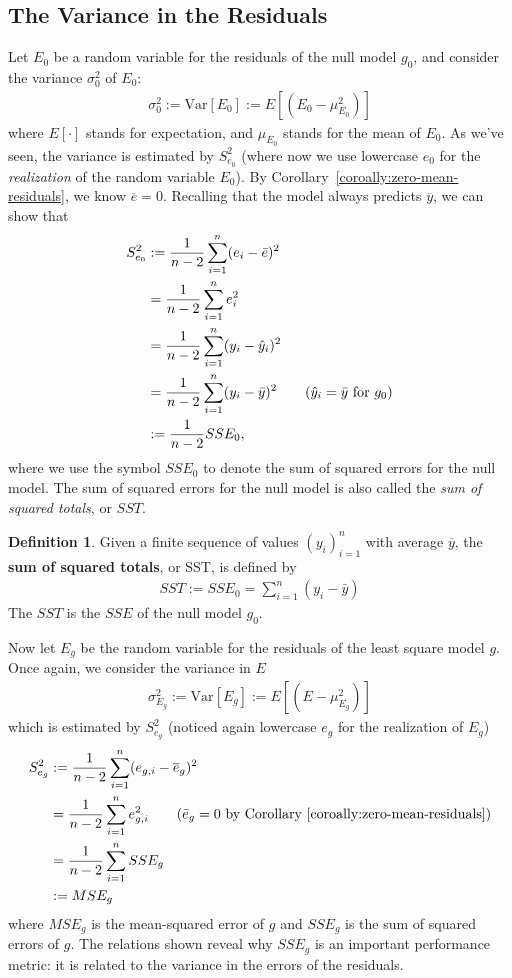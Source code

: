 \documentclass[12pt, a4paper]{article}
\theoremstyle{definition}
\newtheorem*{definition}{Definition}
\begin{document}
	\subsection*{The Variance in the Residuals}
	Let $E_0$ be a random variable for the residuals of the null model $g_0$,
	and consider the variance $\sigma_0^2$ of $E_0$:
	\begin{align*}
		\sigma_{0}^2 := \text{Var}[E_0] := E[(E_0-\mu_{E_0}^2)]
	\end{align*}
	where $E[\cdot]$ stands for expectation, and $\mu_{E_0}$ stands for the mean
	of $E_0$. As we've seen, the variance is estimated by $S^2_{e_0}$
	(where now we use lowercase $e_0$ for the \emph{realization} of the
	random variable $E_0$). By Corollary~\ref{coroally:zero-mean-residuals}, we
	know $\overline{e}=0$. Recalling that the model always predicts $\overline{y}$,
	we can show that
	\begin{align*}
		S_{e_0}^2 &:= \frac{1}{n-2}\sum_{i=1}^{n}(e_i-\bar{e})^2\\
		&=\frac{1}{n-2}\sum_{i=1}^{n}e_i^2\\
		&=\frac{1}{n-2}\sum_{i=1}^{n}(y_i-\hat{y}_i)^2\\
		&=\frac{1}{n-2}\sum_{i=1}^{n}(y_i-\bar{y})^2
		\tag{$\hat{y}_i=\bar{y}$ for $g_0$}\\
		&:=\frac{1}{n-2}SSE_0,
	\end{align*}
	where we use the symbol $SSE_0$ to denote the sum of squared errors for the null model.
	The sum of squared errors for the null model is also called the \emph{sum of squared totals},
	or $SST$.
	\begin{tcolorbox}[breakable]
		\begin{definition}
			Given a finite sequence of values $(y_i)_{i=1}^{n}$ with average $\overline{y}$,
			the \textbf{sum of squared totals}, or SST, is defined by
			\begin{align*}
				SST := SSE_0 = \sum_{i=1}^{n}(y_i-\bar{y})
			\end{align*}
			The $SST$ is the $SSE$ of the null model $g_0$.
		\end{definition}
	\end{tcolorbox}
	Now let $E_g$ be the random variable for the residuals of the least square model $g$.
	Once again, we consider the variance in $E$
	\begin{align*}
		\sigma_{E_g}^2 := \text{Var}[E_g] := E[(E-\mu_{E_g}^2)]
	\end{align*}
	which is estimated by $S_{e_g}^2$ (noticed again lowercase $e_g$ for the realization of $E_g$)
	\begin{align*}
		S_{e_g}^2 &:= \frac{1}{n-2} \sum_{i=1}^{n}(e_{g,i}-\overline{e}_g)^2\\
		&=\frac{1}{n-2}\sum_{i=1}^{n}e_{g,i}^2
		\tag{$\bar{e}_g=0$ by Corollary~\ref{coroally:zero-mean-residuals}}\\
		&=\frac{1}{n-2}\sum_{i=1}^{n}SSE_g\\
		&:=MSE_g
	\end{align*}
	where $MSE_g$ is the mean-squared error of $g$ and $SSE_g$ is the sum of squared errors of $g$.
	The relations shown reveal why $SSE_g$ is an important performance metric: it is related
	to the variance in the errors of the residuals.
\end{document}
